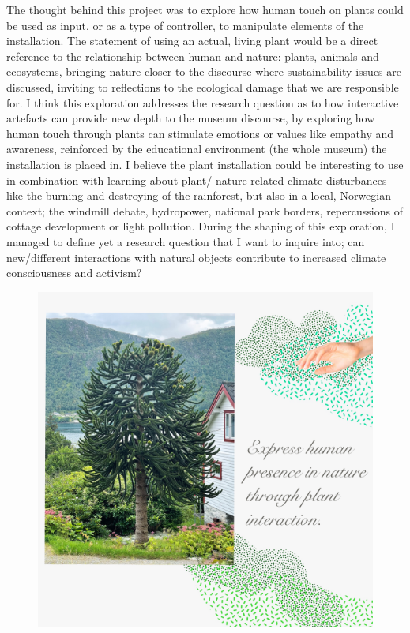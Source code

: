 The thought behind this project was to explore how human touch on plants could be used as input, or as a type of controller, to manipulate elements of the installation. The statement of using an actual, living plant would be a direct reference to the relationship between human and nature: plants, animals and ecosystems, bringing nature closer to the discourse where sustainability issues are discussed, inviting to reflections to the ecological damage that we are responsible for. I think this exploration addresses the research question as to how interactive artefacts can provide new depth to the museum discourse, by exploring how human touch through plants can stimulate emotions or values like empathy and awareness, reinforced by the educational environment (the whole museum) the installation is placed in. I believe the plant installation could be interesting to use in combination with learning about plant/ nature related climate disturbances like the burning and destroying of the rainforest, but also in a local, Norwegian context; the windmill debate, hydropower, national park borders, repercussions of cottage development or light pollution. During the shaping of this exploration, I managed to define yet a research question that I want to inquire into; can new/different interactions with natural objects contribute to increased climate consciousness and activism?	

\begin{figure}[H]
\includegraphics[width=13cm]{pictures/human_presence.jpg}
\centering 
\end{figure}


